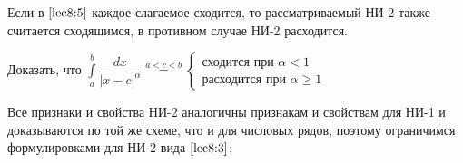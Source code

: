 \documentclass[../../main.tex]{subfiles}
\begin{document}
Если в $\eqref{lec8:5}$ каждое слагаемое сходится, то рассматриваемый НИ-2 
также считается сходящимся, в противном случае НИ-2 расходится.

\begin{exc}
 Доказать, что $\displaystyle\int\limits_{a}^{b} \dfrac{dx}{|x - c|^{\alpha}} 
 \overset{a < c < b} = \begin{cases}
 \text{сходится при } \alpha < 1\\
 \text{расходится при } \alpha \geq 1
 \end{cases}$ 
\end{exc}

Все признаки и свойства НИ-2 аналогичны признакам и свойствам для НИ-1 и 
доказываются по той же схеме, что и для числовых рядов, поэтому ограничимся 
формулировками для НИ-2 вида $\eqref{lec8:3}$:
\end{document}
